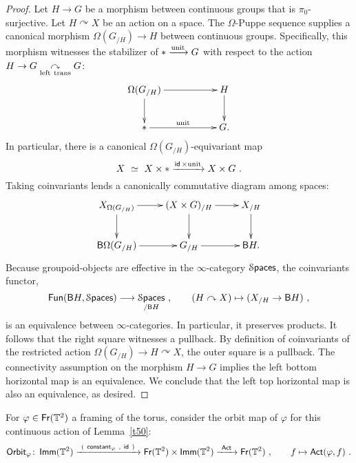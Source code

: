 \documentclass{amsart}
\theoremstyle{definition}
\theoremstyle{remark}
\DeclareMathOperator{\Fun}{{\sf Fun}}
\newcommand{\lacts}{\curvearrowright}
\DeclareMathOperator{\Spaces}{\cS\mathsf{paces}}
\newcommand{\xra}{\xrightarrow}
\DeclareMathOperator{\Fr}{\sf Fr}
\DeclareMathOperator{\id}{\sf id}
\DeclareMathOperator{\Imm}{\sf Imm}
\begin{document}
\begin{proof}
Let $H \to G$ be a morphism between continuous groups that is $\pi_0$-surjective.
Let $H\lacts X$ be an action on a space.  
The $\Omega$-Puppe sequence supplies a canonical morphism 
$
\Omega (G_{/H})
\to 
H
$
between continuous groups.
Specifically, this morphism witnesses the stabilizer of $\ast \xra{\rm unit} G$ with respect to the action $H \to G \underset{\rm left~trans}\lacts G$:
\[
\xymatrix{
\Omega (G_{/H})
\ar[rr]
\ar[d]
&&
H
\ar[d]
\\
\ast
\ar[rr]^-{\rm unit}
&&
G
.
}
\]
In particular, there is a canonical $\Omega (G_{/H})$-equivariant map
\[
X
~\simeq~
X\times \ast
\xra{ \id \times {\rm unit}}
X \times G
~.
\]
Taking coinvariants lends a canonically commutative diagram among spaces:
\[
\xymatrix{
X_{ \Omega (G_{/H}) }
\ar[d]
\ar[r]
&
(X \times  G)_{/H}
\ar[r]
\ar[d]
&
X_{/H}
\ar[d]
\\
\sB \Omega (G_{/H})
\ar[r]
&
G_{/H}
\ar[r]
&
\sB H
.
}
\]
Because groupoid-objects are effective in the $\infty$-category $\Spaces$,
the coinvariants functor,
\[
\Fun ( \sB H , \Spaces )
\longrightarrow
\Spaces_{/\sB H}
~,\qquad
(H \lacts X)
\mapsto 
( X_{/H} \to \sB H)
~,
\]
is an equivalence between $\infty$-categories.
In particular, it preserves products.
It follows that the right square witnesses a pullback.  
By definition of coinvariants of the restricted action $\Omega (G_{/H}) \to H \lacts X$, the outer square is a pullback.  
The connectivity assumption on the morphism $H\to G$ implies the left bottom horizontal map is an equivalence.  
We conclude that the left top horizontal map is also an equivalence, as desired.  



\end{proof}






























For $\varphi\in \Fr(\TT^2)$ a framing of the torus, consider the orbit map of $\varphi$ for this continuous action of Lemma~\ref{t50}:
\[
{\sf Orbit}_\varphi
\colon
\Imm(\TT^2)
\xra{~( ~ {\sf constant}_{\varphi}~ , ~\id ~ )~}
\Fr(\TT^2)
\times 
\Imm(\TT^2)
\xra{~{\sf Act}~}
\Fr(\TT^2)
~,\qquad
f
\mapsto {\sf Act}(\varphi , f)
~.
\]
\end{document}
